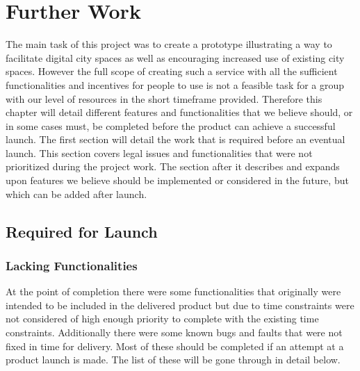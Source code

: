 \chapter{Further Work}
\label{chap:Further}

The main task of this project was to create a prototype illustrating a way to facilitate digital city spaces as well as encouraging increased use of existing city spaces. However the full scope of creating such a service with all the sufficient functionalities and incentives for people to use is not a feasible task for a group with our level of resources in the short timeframe provided. Therefore this chapter will detail different features and functionalities that we believe should, or in some cases must, be completed before the product can achieve a successful launch. The first section will detail the work that is required before an eventual launch. This section covers legal issues and functionalities that were not prioritized during the project work. The section after it describes and expands upon features we believe should be implemented or considered in the future, but which can be added after launch.

\section{Required for Launch}
\label{sec:FurtherRequired}

\subsection{Lacking Functionalities}
\label{subsec:FurtherRequiredLacking}

At the point of completion there were some functionalities that originally were intended to be included in the delivered product but due to time constraints were not considered of high enough priority to complete with the existing time constraints. Additionally there were some known bugs and faults that were not fixed in time for delivery. Most of these should be completed if an attempt at a product launch is made. The list of these will be gone through in detail below.

